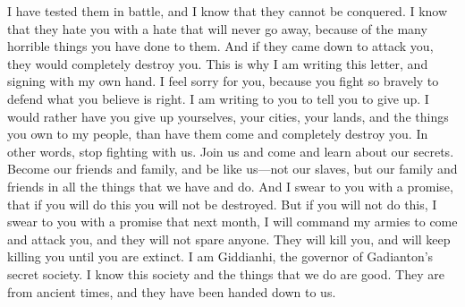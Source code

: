 I have tested them in battle, and I know that they cannot be conquered. I know that they hate you with a hate that will never go away, because of the many horrible things you have done to them. And if they came down to attack you, they would completely destroy you.
\bverse \iffalse Therefore I have written this epistle, sealing it with mine own hand, feeling for your welfare, because of your firmness in that which ye believe to be right, and your noble spirit in the field of battle. \fi
This is why I am writing this letter, and signing with my own hand. I feel sorry for you, because you fight so bravely to defend what you believe is right.
\bverse \iffalse Therefore I write unto you, desiring that ye would yield up unto this my people, your cities, your lands, and your possessions, rather than that they should visit you with the sword and that destruction should come upon you. \fi
I am writing to you to tell you to give up. I would rather have you give up yourselves, your cities, your lands, and the things you own to my people, than have them come and completely destroy you.
\bverse \iffalse Or in other words, yield yourselves up unto us, and unite with us and become acquainted with our secret works, and become our brethren that ye may be like unto us--not our slaves, but our brethren and partners of all our substance. \fi
In other words, stop fighting with us. Join us and come and learn about our secrets. Become our friends and family, and be like us---not our slaves, but our family and friends in all the things that we have and do.
\bverse \iffalse And behold, I swear unto you, if ye will do this, with an oath, ye shall not be destroyed; but if ye will not do this, I swear unto you with an oath, that on the morrow month I will command that my armies shall come down against you, and they shall not stay their hand and shall spare not, but shall slay you, and shall let fall the sword upon you even until ye shall become extinct. \fi
And I swear to you with a promise, that if you will do this you will not be destroyed. But if you will not do this, I swear to you with a promise that next month, I will command my armies to come and attack you, and they will not spare anyone. They will kill you, and will keep killing you until you are extinct.
\bverse \iffalse And behold, I am Giddianhi; and I am the governor of this the secret society of Gadianton; which society and the works thereof I know to be good; and they are of ancient date and they have been handed down unto us. \fi
I am Giddianhi, the governor of Gadianton's secret society. I know this society and the things that we do are good. They are from ancient times, and they have been handed down to us.
